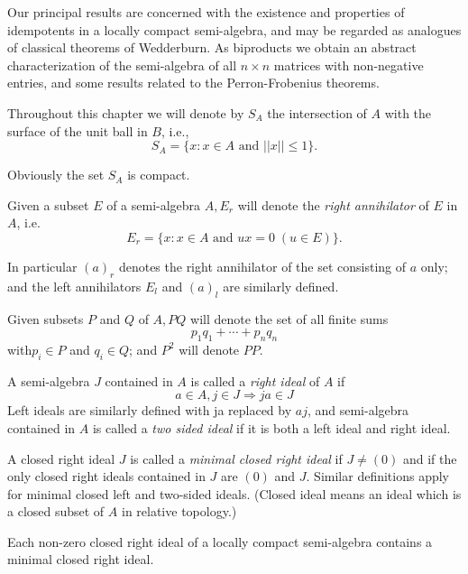 Our principal results are concerned with the existence and properties
of idempotents in a locally compact semi-algebra, and may be regarded
as analogues of classical theorems of Wedderburn. As biproducts we
obtain an abstract characterization of the semi-algebra of all $n
\times n$ matrices with non-negative entries, and some results
related to the Perron-Frobenius theorems. 

Throughout this chapter we will denote by $S_A$ the intersection of
$A$ with the surface of the unit ball in $B$, i.e., 
$$
S_A = \{ x : x \in A \text{ and } || x || \leq 1 \}.
$$

Obviously the set $S_A$ is compact.

\begin{Definition}%
  Given a subset $E$ of a semi-algebra $A, E_r$ will denote the
  \textit{right annihilator} of $E$ in $A$, i.e. 
  $$
  E_r = \{ x : x \in A \text{ and } ux = 0 \; ( u \in E)\}.
  $$

  In particular $(a)_r$ denotes the right annihilator of the set
  consisting of $a$ only; and the left annihilators $E_l$ and $(a)_l$
  are similarly defined. 
\end{Definition}

\begin{Definition}%
  Given subsets $P$ and $Q$ of $A, PQ$ will denote the set of all finite sums 
  $$
  p_1 q_1 + \cdots + p_n q_n
  $$
  with\pageoriginale $p_i \in P$ and $q_i \in Q$; and $P^2$ will denote $PP$.
\end{Definition}

\begin{Definition}%
  A semi-algebra $J$ contained in $A$ is called a \textit{right
    ideal} of $A$ if  
  $$
  a \in A, j \in J \Rightarrow ja \in J
  $$
  Left ideals are similarly defined with ja replaced by $aj$, and
  semi-algebra contained in $A$ is called a \textit{two sided ideal}
  if it is both a left ideal and right ideal. 
\end{Definition}

A closed right ideal $J$ is called a \textit{minimal closed right
  ideal} if $J \neq (0)$ and if the only closed right ideals contained
in $J$ are $(0)$ and $J$. Similar definitions apply for minimal closed
left and two-sided ideals. (Closed ideal means an ideal which is a
closed subset of $A$ in relative topology.) 

\begin{thmm}\label{chap8:thm8.1}%
  Each non-zero closed right ideal of a locally compact semi-algebra
  contains a minimal closed right ideal. 
\end{thmm}

